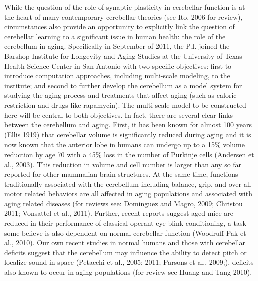 \documentclass[12pt]{article}
\begin{document}
\noindent While the question of the role of synaptic plasticity in cerebellar function is at the heart of many contemporary cerebellar theories (see Ito, 2006 for review), circumstances also provide an opportunity to explicitly link the question of cerebellar learning to a significant issue in human health: the role of the cerebellum in aging. Specifically in September of 2011, the P.I. joined the Barshop Institute for Longevity and Aging Studies at the University of Texas Health Science Center in San Antonio with two specific objectives: first to introduce computation approaches, including multi-scale modeling, to the institute; and second to further develop the cerebellum as a model system for studying the aging process and treatments that affect aging (such as caloric restriction and drugs like rapamycin). The multi-scale model to be constructed here will be central to both objectives. In fact, there are several clear links between the cerebellum and aging. First, it has been known for almost 100 years (Ellis 1919) that cerebellar volume is significantly reduced during aging and it is now known that the anterior lobe in humans can undergo up to a 15\% volume reduction by age 70 with a 45\% loss in the number of Purkinje cells (Andersen et al., 2003). This reduction in volume and cell number is larger than any so far reported for other mammalian brain structures. At the same time, functions traditionally associated with the cerebellum including balance, grip, and over all motor related behaviors are all affected in aging populations and associated with aging related diseases (for reviews see: Dominguez and Magro, 2009; Christou 2011; Vonsattel et al., 2011). Further, recent reports suggest aged mice are reduced in their performance of classical operant eye blink conditioning, a task some believe is also dependent on normal cerebellar function (Woodruff-Pak et al., 2010). Our own recent studies in normal humans and those with cerebellar deficits suggest that the cerebellum may influence the ability to detect pitch or localize sound in space (Petacchi et al., 2005; 2011; Parsons et al., 2009;), deficits also known to occur in aging populations (for review see Huang and Tang 2010).
\end{document}
